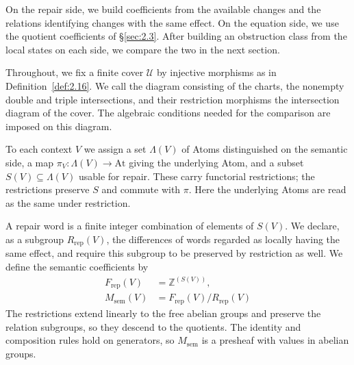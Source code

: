 On the repair side, we build coefficients from the available changes and the relations
identifying changes with the same effect. On the equation side, we use the quotient
coefficients of \S\ref{sec:2.3}. After building an obstruction class from the local
states on each side, we compare the two in the next section.

Throughout, we fix a finite cover $\mathcal{U}$ by injective morphisms as in
Definition~\ref{def:2.16}. We call the diagram consisting of the charts, the nonempty
double and triple intersections, and their restriction morphisms the intersection
diagram of the cover. The algebraic conditions needed for the comparison are imposed on
this diagram.

\begin{definition}\label{def:2.43}

To each context $V$ we assign a set $\Lambda(V)$ of Atoms distinguished on the semantic
side, a map $\pi_V:\Lambda(V)\to\mathrm{At}$ giving the underlying Atom, and a subset
$S(V)\subseteq\Lambda(V)$ usable for repair. These carry functorial restrictions; the
restrictions preserve $S$ and commute with $\pi$. Here the underlying Atoms are read as
the same under restriction.

A repair word is a finite integer combination of elements of $S(V)$. We declare, as a subgroup
$R_{\mathrm{rep}}(V)$, the differences of words regarded as locally having the same
effect, and require this subgroup to be preserved by restriction as well.
We define the semantic coefficients by
\begin{equation*}
\begin{aligned}
F_{\mathrm{rep}}(V)&=\mathbb{Z}^{(S(V))},\\
M_{\mathrm{sem}}(V)&=F_{\mathrm{rep}}(V)/R_{\mathrm{rep}}(V)
\end{aligned}
\tag{2.28}\label{eq:2.28}
\end{equation*}
The restrictions extend linearly to the free abelian groups and preserve the relation
subgroups, so they descend to the quotients. The identity and composition rules hold on
generators, so $M_{\mathrm{sem}}$ is a presheaf with values in abelian groups.

\end{definition}

